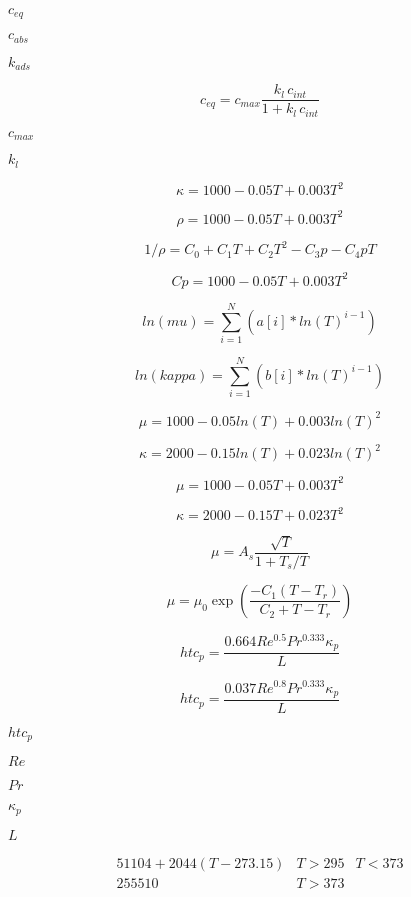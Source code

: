 \documentclass{article}
\begin{document}
$      c_{eq}       $
\pagebreak

$      c_{abs}      $
\pagebreak

$      k_{ads}      $
\pagebreak

\[
        c_{eq} = c_{max} \frac{k_l \, c_{int}}{1 + k_l \, c_{int}}
    \]
\pagebreak

$      c_{max}      $
\pagebreak

$      k_l          $
\pagebreak

\[
            \kappa = 1000 - 0.05 T + 0.003 T^2
        \]
\pagebreak

\[
            \rho = 1000 - 0.05 T + 0.003 T^2
        \]
\pagebreak

\[
    1/\rho = C_0 + C_1 T + C_2 T^2 - C_3 p - C_4 p T
\]
\pagebreak

\[
            Cp = 1000 - 0.05 T + 0.003 T^2
        \]
\pagebreak

\[
        ln(mu)    = \sum_{i=1}^N \left( a[i] * ln(T)^{i-1} \right)
    \]
\pagebreak

\[
        ln(kappa) = \sum_{i=1}^N \left( b[i] * ln(T)^{i-1} \right)
    \]
\pagebreak

\[
            \mu    = 1000 - 0.05 ln(T) + 0.003 ln(T)^2
        \]
\pagebreak

\[
            \kappa = 2000 - 0.15 ln(T) + 0.023 ln(T)^2
        \]
\pagebreak

\[
            \mu    = 1000 - 0.05 T + 0.003 T^2
        \]
\pagebreak

\[
            \kappa = 2000 - 0.15 T + 0.023 T^2
        \]
\pagebreak

\[
    \mu = A_s \frac{\sqrt{T}}{1 + T_s / T}
\]
\pagebreak

\[
    \mu = \mu_0 \exp \left(\frac{-C_1 ( T - T_r )}{C_2 + T - T_r}\right)
\]
\pagebreak

\[
    htc_p = \frac{0.664 Re^{0.5} Pr^{0.333} \kappa_p}{L}
\]
\pagebreak

\[
    htc_p = \frac{0.037 Re^{0.8} Pr^{0.333} \kappa_p}{L}
\]
\pagebreak

$        htc_p   $
\pagebreak

$        Re      $
\pagebreak

$        Pr      $
\pagebreak

$        \kappa_p $
\pagebreak

$        L       $
\pagebreak

\begin{eqnarray*}
    51104 + 2044 (T - 273.15)   & T > 295 & T < 373 \\
    255510                      & T > 373 &
\end{eqnarray*}
\pagebreak
\end{document}
